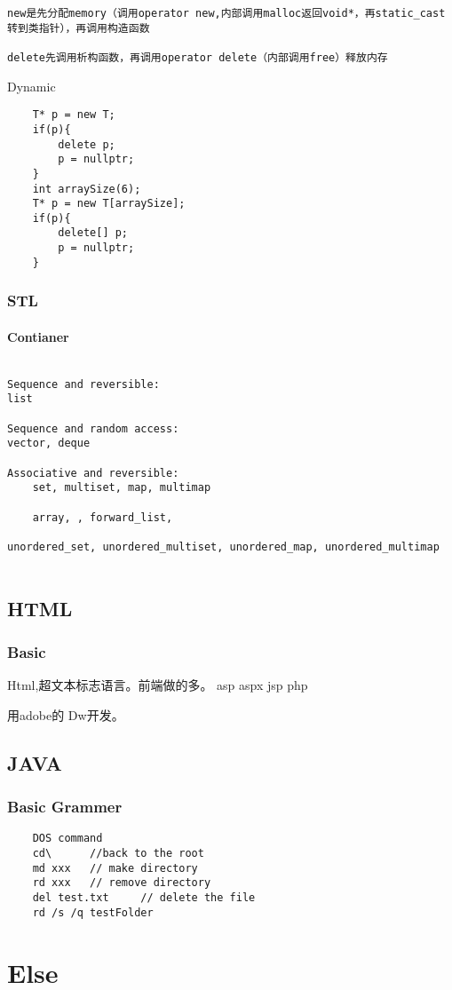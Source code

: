\documentclass[UTF8]{../computerUniverse}
\begin{document}
\begin{lstlisting}
new是先分配memory（调用operator new,内部调用malloc返回void*，再static_cast转到类指针），再调用构造函数

delete先调用析构函数，再调用operator delete（内部调用free）释放内存
\end{lstlisting}

Dynamic
\begin{lstlisting}
    T* p = new T;
    if(p){
        delete p;
        p = nullptr;
    }
    int arraySize(6);
    T* p = new T[arraySize];
    if(p){
        delete[] p;
        p = nullptr;
    }
\end{lstlisting}



\subsection{STL}
\subsubsection{Contianer}
\begin{lstlisting}

Sequence and reversible:
list 

Sequence and random access:
vector, deque

Associative and reversible:
    set, multiset, map, multimap  

    array, , forward_list,  

unordered_set, unordered_multiset, unordered_map, unordered_multimap  


\end{lstlisting}




\section{HTML}

\subsection{Basic}
Html,超文本标志语言。前端做的多。
asp
aspx
jsp
php

用adobe的 Dw开发。


\section{JAVA}

\subsection{Basic Grammer}
\begin{lstlisting}
    DOS command
    cd\      //back to the root
    md xxx   // make directory
    rd xxx   // remove directory
    del test.txt     // delete the file
    rd /s /q testFolder
 \end{lstlisting}


\chapter{Else}
\end{document}
